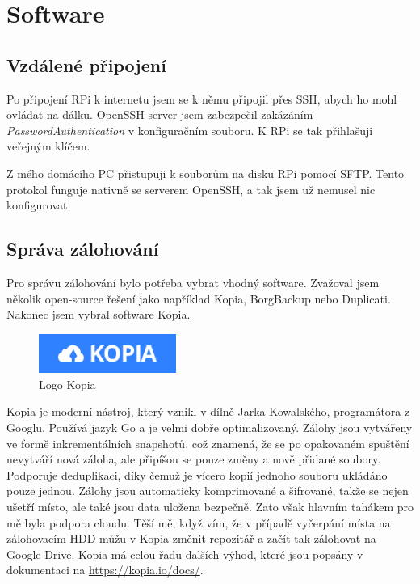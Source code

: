\documentclass[a4paper,12pt, oneside]{book}
\begin{document}


\chapter{Software}

\section{Vzdálené připojení}

Po připojení RPi k internetu jsem se k němu připojil přes SSH, 
abych ho mohl ovládat na dálku. OpenSSH server jsem zabezpečil zakázáním
\emph{Password\-Authentication} v konfiguračním souboru. K RPi se tak přihlašuji  
veřejným klíčem. 

Z mého domácího PC přistupuji k souborům na disku RPi pomocí SFTP.
Tento protokol funguje nativně se serverem OpenSSH, a tak jsem už nemusel
nic konfigurovat.

\section{Správa zálohování}
Pro správu zálohování bylo potřeba vybrat vhodný software. 
Zvažoval jsem několik open-source řešení jako například 
Kopia, BorgBackup nebo Duplicati. Nakonec jsem vybral software 
Kopia. 

\begin{figure}
	\centering
	\includegraphics[width=0.4\textwidth]{img/kopia.jpg}
	\caption{Logo Kopia}
\end{figure}

Kopia je moderní nástroj, který vznikl v dílně Jarka Kowalského, 
programátora z Googlu. Používá jazyk Go a je velmi dobře optimalizovaný.
\cite{Kopia-GitHub}
Zálohy jsou vytvářeny ve formě inkrementálních snapshotů,
což znamená, že se po opakovaném spuštění nevytváří nová záloha, ale 
připíšou se pouze změny a nově přidané soubory. Podporuje deduplikaci,
díky čemuž je vícero kopií jednoho souboru ukládáno pouze jednou. 
Zálohy jsou automaticky komprimované a šifrované, takže se nejen ušetří 
místo, ale také jsou data uložena bezpečně. \cite{Kopia-Docs} Zato však hlavním
tahákem pro mě byla podpora cloudu. Těší mě, když vím, že v případě vyčerpání
místa na 
zálohovacím HDD můžu v Kopia změnit repozitář a začít tak zálohovat na 
Google Drive.
Kopia má celou řadu dalších výhod,
které jsou popsány v dokumentaci na \url{https://kopia.io/docs/}.
\end{document}
